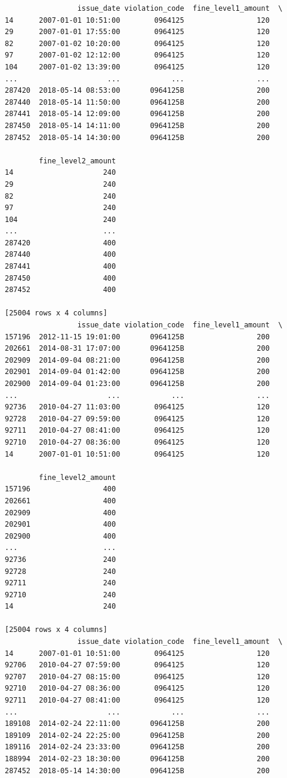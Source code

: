 \documentclass[
  letterpaper,
  DIV=11,
  numbers=noendperiod]{scrartcl}
\begin{document}
\begin{verbatim}
                 issue_date violation_code  fine_level1_amount  \
14      2007-01-01 10:51:00        0964125                 120   
29      2007-01-01 17:55:00        0964125                 120   
82      2007-01-02 10:20:00        0964125                 120   
97      2007-01-02 12:12:00        0964125                 120   
104     2007-01-02 13:39:00        0964125                 120   
...                     ...            ...                 ...   
287420  2018-05-14 08:53:00       0964125B                 200   
287440  2018-05-14 11:50:00       0964125B                 200   
287441  2018-05-14 12:09:00       0964125B                 200   
287450  2018-05-14 14:11:00       0964125B                 200   
287452  2018-05-14 14:30:00       0964125B                 200   

        fine_level2_amount  
14                     240  
29                     240  
82                     240  
97                     240  
104                    240  
...                    ...  
287420                 400  
287440                 400  
287441                 400  
287450                 400  
287452                 400  

[25004 rows x 4 columns]
                 issue_date violation_code  fine_level1_amount  \
157196  2012-11-15 19:01:00       0964125B                 200   
202661  2014-08-31 17:07:00       0964125B                 200   
202909  2014-09-04 08:21:00       0964125B                 200   
202901  2014-09-04 01:42:00       0964125B                 200   
202900  2014-09-04 01:23:00       0964125B                 200   
...                     ...            ...                 ...   
92736   2010-04-27 11:03:00        0964125                 120   
92728   2010-04-27 09:59:00        0964125                 120   
92711   2010-04-27 08:41:00        0964125                 120   
92710   2010-04-27 08:36:00        0964125                 120   
14      2007-01-01 10:51:00        0964125                 120   

        fine_level2_amount  
157196                 400  
202661                 400  
202909                 400  
202901                 400  
202900                 400  
...                    ...  
92736                  240  
92728                  240  
92711                  240  
92710                  240  
14                     240  

[25004 rows x 4 columns]
                 issue_date violation_code  fine_level1_amount  \
14      2007-01-01 10:51:00        0964125                 120   
92706   2010-04-27 07:59:00        0964125                 120   
92707   2010-04-27 08:15:00        0964125                 120   
92710   2010-04-27 08:36:00        0964125                 120   
92711   2010-04-27 08:41:00        0964125                 120   
...                     ...            ...                 ...   
189108  2014-02-24 22:11:00       0964125B                 200   
189109  2014-02-24 22:25:00       0964125B                 200   
189116  2014-02-24 23:33:00       0964125B                 200   
188994  2014-02-23 18:30:00       0964125B                 200   
287452  2018-05-14 14:30:00       0964125B                 200   


\end{verbatim}
\end{document}
